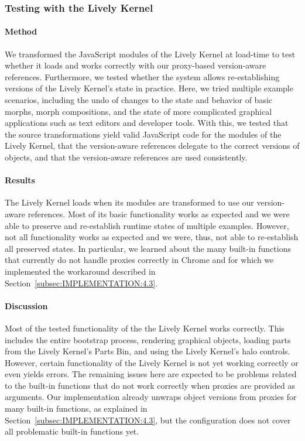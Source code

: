 \subsubsection{Testing with the Lively Kernel}

\paragraph{Method}
We transformed the JavaScript modules of the Lively Kernel at
load-time to test whether it loads and works correctly with our
proxy-based version-aware references.  Furthermore, we tested whether
the system allows re-establishing versions of the Lively Kernel's
state in practice.  Here, we tried multiple example scenarios,
including the undo of changes to the state and behavior of basic
morphs, morph compositions, and the state of more complicated
graphical applications such as text editors and developer tools.  With
this, we tested that the source transformations yield valid JavaScript
code for the modules of the Lively Kernel, that the version-aware
references delegate to the correct versions of objects, and that the
version-aware references are used consistently.


\paragraph{Results}
The Lively Kernel loads when its modules are transformed to use our
version-aware references.  Most of its basic functionality works as
expected and we were able to preserve and re-establish runtime states
of multiple examples.  However, not all functionality works as
expected and we were, thus, not able to re-establish all preserved
states.  In particular, we learned about the many built-in functions
that currently do not handle proxies correctly in Chrome and for which
we implemented the workaround described in
Section~\ref{subsec:IMPLEMENTATION:4.3}.

\paragraph{Discussion}
Most of the tested functionality of the the Lively Kernel works
correctly.  This includes the entire bootstrap process, rendering
graphical objects, loading parts from the Lively Kernel's Parts Bin,
and using the Lively Kernel's halo controls.  However, certain
functionality of the Lively Kernel is not yet working correctly or
even yields errors.  The remaining issues here are expected to be
problems related to the built-in functions that do not work correctly
when proxies are provided as arguments.  Our implementation already
unwraps object versions from proxies for many built-in functions, as
explained in Section~\ref{subsec:IMPLEMENTATION:4.3}, but the
configuration does not cover all problematic built-in functions yet.

